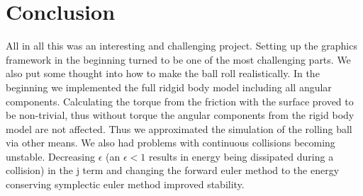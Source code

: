\documentclass[11pt,a4paper]{article}
\begin{document}
\section{Conclusion}
\label{sec:conclusion}
All in all this was an interesting and challenging project. Setting up the graphics framework in the beginning turned to be one of the most challenging parts. We also put some thought into how to make the ball roll realistically. In the beginning we implemented the full ridgid body model including all angular components. Calculating the torque from the friction with the surface proved to be non-trivial, thus without torque the angular components from the rigid body model are not affected. Thus we approximated the simulation of the rolling ball via other means. We also had problems with continuous collisions becoming unstable. Decreasing $\epsilon$ (an $\epsilon < 1$ results in energy being dissipated during a collision) in the j term and changing the forward euler method to the energy conserving symplectic euler method improved stability.
\newpage


\end{document}
